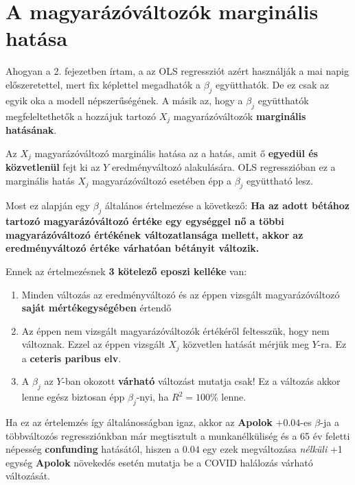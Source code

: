 \documentclass[
]{book}
\providecommand{\tightlist}{%
  \setlength{\itemsep}{0pt}\setlength{\parskip}{0pt}}
\begin{document}
\section{A magyarázóváltozók marginális hatása}\label{a-magyaruxe1zuxf3vuxe1ltozuxf3k-marginuxe1lis-hatuxe1sa}

Ahogyan a 2. fejezetben írtam, a az OLS regressziót azért használják a mai napig előszeretettel, mert fix képlettel megadhatók a \(\beta_j\) együtthatók. De ez csak az egyik oka a modell népszerűségének. A másik az, hogy a \(\beta_j\) együtthatók megfeleltethetők a hozzájuk tartozó \(X_j\) magyarázóváltozók \textbf{marginális hatásának}.

Az \(X_j\) magyarázóváltozó marginális hatása az a hatás, amit ő \textbf{egyedül és közvetlenül} fejt ki az \(Y\) eredményváltozó alakulására. OLS regresszióban ez a marginális hatás \(X_j\) magyarázóváltozó esetében épp a \(\beta_j\) együttható lesz.

Most ez alapján egy \(\beta_j\) általános értelmezése a következő: \textbf{Ha az adott bétához tartozó magyarázóváltozó értéke egy egységgel nő a többi magyarázóváltozó értékének változatlansága mellett, akkor az eredményváltozó értéke várhatóan bétányit változik.}

Ennek az értelmezésnek \textbf{3 kötelező eposzi kelléke} van:

\begin{enumerate}
\def\labelenumi{\arabic{enumi}.}
\tightlist
\item
  Minden változás az eredményváltozó és az éppen vizsgált magyarázóváltozó \textbf{saját mértékegységében} értendő
\item
  Az éppen nem vizsgált magyarázóváltozók értékéről feltesszük, hogy nem változnak. Ezzel az éppen vizsgált \(X_j\) közvetlen hatását mérjük meg \(Y\)-ra. Ez a \textbf{ceteris paribus elv}.
\item
  A \(\beta_j\) az \(Y\)-ban okozott \textbf{várható} változást mutatja csak! Ez a változás akkor lenne egész biztosan épp \(\beta_j\)-nyi, ha \(R^2=100\%\) lenne.
\end{enumerate}

Ha ez az értelemzés így általánosságban igaz, akkor az \textbf{Apolok} \(+0.04\)-es \(\beta\)-ja a többváltozós regressziónkban már megtisztult a munkanélküliség és a 65 év feletti népesség \textbf{confunding} hatásától, hiszen a \(0.04\) egy ezek megváltozása \emph{nélküli} +1 egység \textbf{Apolok} növekedés esetén mutatja be a COVID halálozás várható változását.
\end{document}
